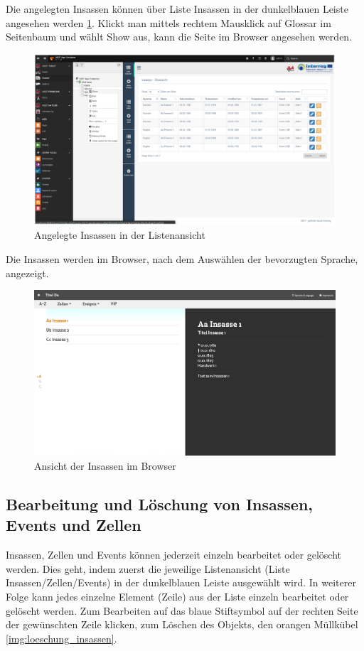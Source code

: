 Die angelegten Insassen können über Liste Insassen in der dunkelblauen Leiste angesehen werden \ref{img:angelegte_insassen_listenuebersicht}. Klickt man mittels rechtem Mausklick auf Glossar im Seitenbaum und wählt Show aus, kann die Seite im Browser angesehen werden.
\begin{figure}[ht!]
\centering
\includegraphics[width=12cm]{Figures/paula/glossar/angelegte_insassen_listenuebersicht.png}
\caption{Angelegte Insassen in der Listenansicht}
\label{img:angelegte_insassen_listenuebersicht}
\end{figure}
Die Insassen werden im Browser, nach dem Auswählen der bevorzugten Sprache, angezeigt.
\begin{figure}[ht!]
\centering
\includegraphics[width=12cm]{Figures/paula/glossar/insassenuebersicht_browser.png}
\caption{Ansicht der Insassen im Browser}
\label{img:insassenuebersicht_browser}
\end{figure}

\subsection{Bearbeitung und Löschung von Insassen, Events und Zellen}

Insassen, Zellen und Events können jederzeit einzeln bearbeitet oder gelöscht werden. Dies geht, indem zuerst die jeweilige Listenansicht (Liste Insassen/Zellen/Events) in der dunkelblauen Leiste ausgewählt wird. In weiterer Folge kann jedes einzelne Element (Zeile) aus der Liste einzeln bearbeitet oder gelöscht werden. Zum Bearbeiten auf das blaue Stiftsymbol auf der rechten Seite der gewünschten Zeile klicken, zum Löschen des Objekts, den orangen Müllkübel \ref{img:loeschung_insassen}.

